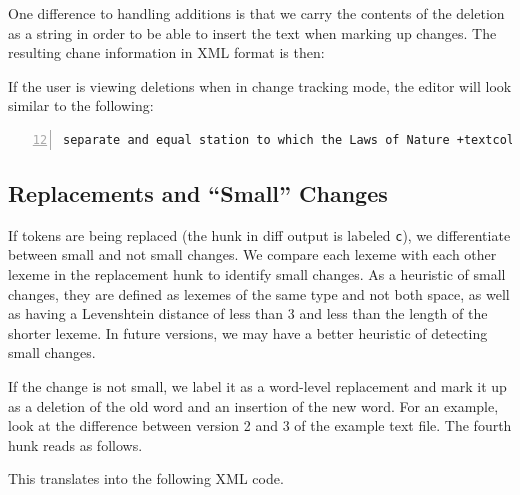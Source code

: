 
One difference to handling additions is that we carry the contents of the deletion as a string in order to be able to insert the text when marking up changes.  The resulting chane information in XML format is then:


If the user is viewing deletions when in change tracking mode, the editor will look similar to the following:

\begin{Verbatim}[frame=lines,label={Markup of deletion block},numbers=left,firstnumber=12,showspaces=true,commandchars=+\{\}]
separate and equal station to which the Laws of Nature +textcolor{red}{+sout{and of Nature's God }}entitle them,
\end{Verbatim}

\subsection{Replacements and ``Small'' Changes}

If tokens are being replaced (the hunk in diff output is labeled \texttt{c}), we differentiate between small and not small changes.  We compare each lexeme with each other lexeme in the replacement hunk to identify small changes.  As a heuristic of small changes, they are defined as lexemes of the same type and not both space, as well as having a Levenshtein distance of less than 3 and less than the length of the shorter lexeme. In future versions, we may have a better heuristic of detecting small changes. %

If the change is not small, we label it as a word-level replacement and mark it up as a deletion of the old word and an insertion of the new word.  For an example, look at the difference between version 2 and 3 of the example text file.  The fourth hunk reads as follows.


This translates into the following XML code.


